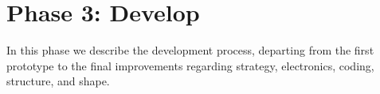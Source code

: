 \section{Phase 3: Develop}

In this phase we describe the development process, departing from the first prototype to the final improvements regarding strategy, electronics, coding, structure, and shape.
